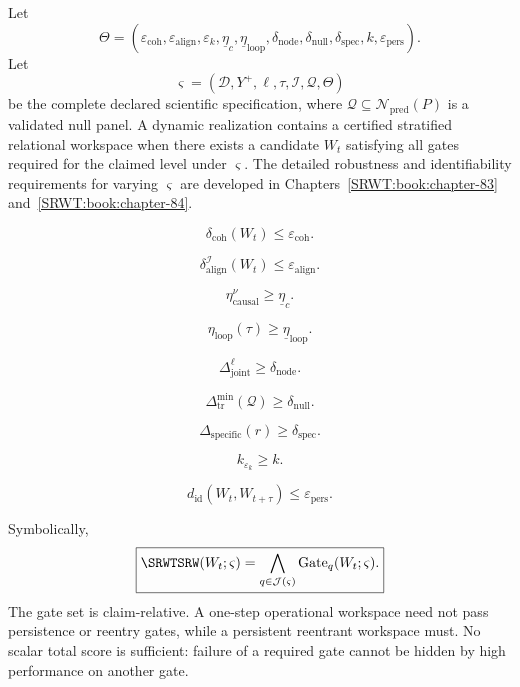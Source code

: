 Let
\[
\Theta
=
\left(
\varepsilon_{\mathrm{coh}},
\varepsilon_{\mathrm{align}},
\varepsilon_k,
\underline\eta_c,
\underline\eta_{\mathrm{loop}},
\delta_{\mathrm{node}},
\delta_{\mathrm{null}},
\delta_{\mathrm{spec}},
k,
\varepsilon_{\mathrm{pers}}
\right).
\]
Let
\[
\varsigma
=
(\mathcal D,Y^+,\ell,\tau,\mathcal I,\mathcal Q,\Theta)
\]
be the complete declared scientific specification, where
\(\mathcal Q\subseteq\mathcal N_{\mathrm{pred}}(P)\) is a validated null panel.
A dynamic realization contains a certified stratified relational workspace
when there exists a candidate \(W_t\) satisfying all gates required for the
claimed level under \(\varsigma\). The detailed robustness and identifiability
requirements for varying \(\varsigma\) are developed in Chapters~\ref{SRWT:book:chapter-83} and~\ref{SRWT:book:chapter-84}.

\[
\delta_{\mathrm{coh}}(W_t)
\leq
\varepsilon_{\mathrm{coh}}.
\]

\[
\delta_{\mathrm{align}}^{\mathcal I}(W_t)
\leq
\varepsilon_{\mathrm{align}}.
\]

\[
\eta_{\mathrm{causal}}^\nu
\geq
\underline\eta_c.
\]

\[
\eta_{\mathrm{loop}}(\tau)
\geq
\underline\eta_{\mathrm{loop}}.
\]

\[
\Delta_{\mathrm{joint}}^{\ell}
\geq
\delta_{\mathrm{node}}.
\]

\[
\Delta_{\mathrm{tr}}^{\min}(\mathcal Q)
\geq
\delta_{\mathrm{null}}.
\]

\[
\Delta_{\mathrm{specific}}(r)
\geq
\delta_{\mathrm{spec}}.
\]

\[
k_{\varepsilon_k}
\geq
k.
\]

\[
d_{\mathrm{id}}(W_t,W_{t+\tau})
\leq
\varepsilon_{\mathrm{pers}}.
\]

Symbolically,
\[
\boxed{
\SRWTSRW(W_t;\varsigma)
=
\bigwedge_{q\in\mathcal J(\varsigma)}
\operatorname{Gate}_q(W_t;\varsigma).
}
\]
The gate set is claim-relative. A one-step operational workspace need not pass
persistence or reentry gates, while a persistent reentrant workspace must.
No scalar total score is sufficient: failure of a required gate cannot be
hidden by high performance on another gate.

